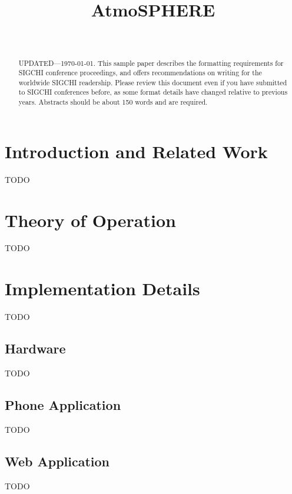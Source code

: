 \documentclass{sigchi}
\begin{document}
\title{AtmoSPHERE}

\author{%
     \\
}

\maketitle

\begin{abstract}
  UPDATED---\today. This sample paper describes the formatting
  requirements for SIGCHI conference proceedings, and offers
  recommendations on writing for the worldwide SIGCHI
  readership. Please review this document even if you have submitted
  to SIGCHI conferences before, as some format details have changed
  relative to previous years. Abstracts should be about 150 words and
  are required.
\end{abstract}



\section{Introduction and Related Work}
TODO

\section{Theory of Operation}
TODO

\section{Implementation Details}
TODO

\subsection{Hardware}
TODO

\subsection{Phone Application}
TODO

\subsection{Web Application}
TODO
\end{document}
